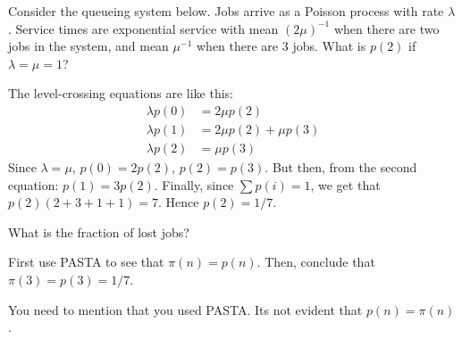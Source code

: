 \begin{exercise}[201807]\label{ex:86}
Consider the queueing system below. Jobs arrive as a Poisson process with rate $\lambda$. Service times are exponential service with mean $(2\mu)^{-1}$ when there are two jobs in the system, and mean $\mu^{-1}$ when there are 3 jobs. What is $p(2)$ if $\lambda=\mu=1$?

\begin{center}
\end{center}


\begin{solution}
The level-crossing equations are like this:
 \begin{align*}
 \lambda p(0) &= 2\mu p(2) \\
 \lambda p(1) &= 2\mu p(2) +\mu p(3) \\
 \lambda p(2) &= \mu p(3) 
 \end{align*}
Since $\lambda=\mu$, $p(0) = 2p(2)$, $p(2) = p(3)$. But then, from the second equation: $p(1) = 3p(2)$. Finally, since $\sum p(i) = 1$, we get that $p(2)(2+3+1+1)=7$. Hence $p(2)=1/7$. 
\end{solution}
\end{exercise}


\begin{exercise}[201807] 
What is the fraction of lost jobs?
\begin{solution}
 First use PASTA to see that $\pi(n) = p(n)$. Then, conclude that $\pi(3) = p(3) = 1/7$. 

You need to mention that you used PASTA. Its not evident that $p(n)=\pi(n)$. 
\end{solution}
\end{exercise}

